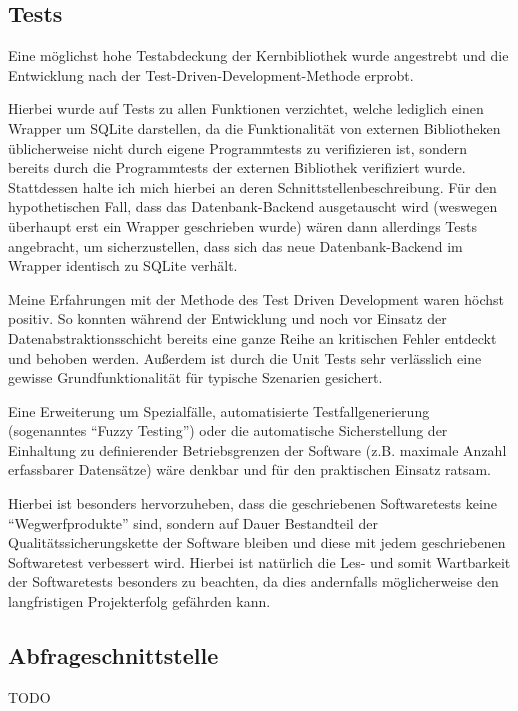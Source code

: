 \subsection{Tests}
Eine möglichst hohe Testabdeckung der Kernbibliothek wurde angestrebt und die Entwicklung nach der
Test-Driven-Development-Methode erprobt.

Hierbei wurde auf Tests zu allen Funktionen verzichtet, welche lediglich einen Wrapper um SQLite darstellen, da die
Funktionalität von externen Bibliotheken üblicherweise nicht durch eigene Programmtests zu verifizieren ist, sondern
bereits durch die Programmtests der externen Bibliothek verifiziert wurde. Stattdessen halte ich mich hierbei an deren
Schnittstellenbeschreibung.
Für den hypothetischen Fall, dass das Datenbank-Backend ausgetauscht wird (weswegen überhaupt erst ein Wrapper
geschrieben wurde) wären dann allerdings Tests angebracht, um sicherzustellen, dass sich das neue Datenbank-Backend im
Wrapper identisch zu SQLite verhält.

Meine Erfahrungen mit der Methode des Test Driven Development waren höchst positiv. So konnten während der Entwicklung
und noch vor Einsatz der Datenabstraktionsschicht bereits eine ganze Reihe an kritischen Fehler entdeckt und behoben werden.
Außerdem ist durch die Unit Tests sehr verlässlich eine gewisse Grundfunktionalität für typische Szenarien gesichert.

Eine Erweiterung um Spezialfälle, automatisierte Testfallgenerierung (sogenanntes ``Fuzzy Testing'') oder die automatische
Sicherstellung der Einhaltung zu definierender Betriebsgrenzen der Software (z.B. maximale Anzahl erfassbarer Datensätze)
wäre denkbar und für den praktischen Einsatz ratsam.

Hierbei ist besonders hervorzuheben, dass die geschriebenen Softwaretests keine ``Wegwerfprodukte'' sind, sondern auf
Dauer Bestandteil der Qualitätssicherungskette der Software bleiben und diese mit jedem geschriebenen Softwaretest
verbessert wird. Hierbei ist natürlich die Les- und somit Wartbarkeit der Softwaretests besonders zu beachten, da dies
andernfalls möglicherweise den langfristigen Projekterfolg gefährden kann.

\subsection{Abfrageschnittstelle}
TODO